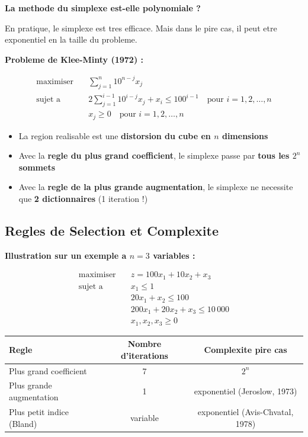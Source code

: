 \documentclass[12pt,a4paper]{article}
\begin{document}
\begin{notecours}
\textbf{La methode du simplexe est-elle polynomiale ?}

En pratique, le simplexe est tres efficace. Mais dans le pire cas, il peut etre exponentiel en la taille du probleme.
\end{notecours}

\begin{definition}
\textbf{Probleme de Klee-Minty (1972) :}

\begin{align*}
\text{maximiser} \quad & \sum_{j=1}^{n} 10^{n-j}x_j\\
\text{sujet a} \quad & 2\sum_{j=1}^{i-1} 10^{i-j}x_j + x_i \leq 100^{i-1} \quad \text{pour } i = 1, 2, \ldots, n\\
& x_j \geq 0 \quad \text{pour } i = 1, 2, \ldots, n
\end{align*}

\begin{itemize}
    \item La region realisable est une \textcolor{algoviolet}{\textbf{distorsion du cube en $n$ dimensions}}
    \item Avec la \textcolor{titrebleu}{\textbf{regle du plus grand coefficient}}, le simplexe passe par \textcolor{importantrouge}{\textbf{tous les $2^n$ sommets}}
    \item Avec la \textcolor{defvert}{\textbf{regle de la plus grande augmentation}}, le simplexe ne necessite que \textcolor{defvert}{\textbf{2 dictionnaires}} (1 iteration !)
\end{itemize}
\end{definition}

\newpage
\subsection{Regles de Selection et Complexite}

\begin{exemple}
\textbf{Illustration sur un exemple a $n=3$ variables :}

\begin{align*}
\text{maximiser} \quad & z = 100x_1 + 10x_2 + x_3\\
\text{sujet a} \quad & x_1 \leq 1\\
& 20x_1 + x_2 \leq 100\\
& 200x_1 + 20x_2 + x_3 \leq 10\,000\\
& x_1, x_2, x_3 \geq 0
\end{align*}

\begin{center}
\begin{tabular}{l|c|c}
\toprule
\textbf{Regle} & \textbf{Nombre d'iterations} & \textbf{Complexite pire cas} \\
\midrule
Plus grand coefficient & 7 & $2^n$ \\
Plus grande augmentation & 1 & exponentiel (Jeroslow, 1973) \\
Plus petit indice (Bland) & variable & exponentiel (Avis-Chvatal, 1978) \\
\bottomrule
\end{tabular}
\end{center}
\end{exemple}
\end{document}
